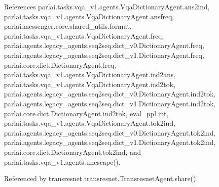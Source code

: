 References parlai.\+tasks.\+vqa\+\_\+v1.\+agents.\+Vqa\+Dictionary\+Agent.\+ans2ind, parlai.\+tasks.\+vqa\+\_\+v1.\+agents.\+Vqa\+Dictionary\+Agent.\+ansfreq, parlai.\+messenger.\+core.\+shared\+\_\+utils.\+format, parlai.\+tasks.\+vqa\+\_\+v1.\+agents.\+Vqa\+Dictionary\+Agent.\+freq, parlai.\+agents.\+legacy\+\_\+agents.\+seq2seq.\+dict\+\_\+v0.\+Dictionary\+Agent.\+freq, parlai.\+agents.\+legacy\+\_\+agents.\+seq2seq.\+dict\+\_\+v1.\+Dictionary\+Agent.\+freq, parlai.\+core.\+dict.\+Dictionary\+Agent.\+freq, parlai.\+tasks.\+vqa\+\_\+v1.\+agents.\+Vqa\+Dictionary\+Agent.\+ind2ans, parlai.\+tasks.\+vqa\+\_\+v1.\+agents.\+Vqa\+Dictionary\+Agent.\+ind2tok, parlai.\+agents.\+legacy\+\_\+agents.\+seq2seq.\+dict\+\_\+v0.\+Dictionary\+Agent.\+ind2tok, parlai.\+agents.\+legacy\+\_\+agents.\+seq2seq.\+dict\+\_\+v1.\+Dictionary\+Agent.\+ind2tok, parlai.\+core.\+dict.\+Dictionary\+Agent.\+ind2tok, eval\+\_\+ppl.\+int, parlai.\+tasks.\+vqa\+\_\+v1.\+agents.\+Vqa\+Dictionary\+Agent.\+tok2ind, parlai.\+agents.\+legacy\+\_\+agents.\+seq2seq.\+dict\+\_\+v0.\+Dictionary\+Agent.\+tok2ind, parlai.\+agents.\+legacy\+\_\+agents.\+seq2seq.\+dict\+\_\+v1.\+Dictionary\+Agent.\+tok2ind, parlai.\+core.\+dict.\+Dictionary\+Agent.\+tok2ind, and parlai.\+tasks.\+vqa\+\_\+v1.\+agents.\+unescape().



Referenced by transresnet.\+transresnet.\+Transresnet\+Agent.\+share().

